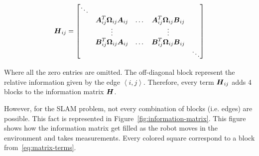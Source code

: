 \begin{equation}
\boldsymbol{H}_{ij} = \begin{bmatrix}
\ddots & & & & \\
& \boldsymbol{A}_{ij}^T \boldsymbol{\Omega}_{ij}\boldsymbol{A}_{ij} & \dots & 
\boldsymbol{A}_{ij}^T \boldsymbol{\Omega}_{ij}\boldsymbol{B}_{ij} & \\
& \vdots & & \vdots & \\
& \boldsymbol{B}_{ij}^T \boldsymbol{\Omega}_{ij}\boldsymbol{A}_{ij} & \dots & 
\boldsymbol{B}_{ij}^T \boldsymbol{\Omega}_{ij}\boldsymbol{B}_{ij} & \\
& & & & \ddots
\end{bmatrix}
\label{eq:matrix-terms}
\end{equation}

Where all the zero entries are omitted. The off-diagonal block represent the relative information given by the edge $\left\langle i,j\right\rangle$. Therefore, every term $\boldsymbol{H}_{ij}$ adds 4 blocks to the information matrix $\boldsymbol{H}$.

However, for the SLAM problem, not every combination of blocks (i.e. edges) are possible. This fact is represented in Figure~\ref{fig:information-matrix}. This figure shows how the information matrix get filled as the robot moves in the environment and takes measurements. Every colored square correspond to a block from~\eqref{eq:matrix-terms}. 

